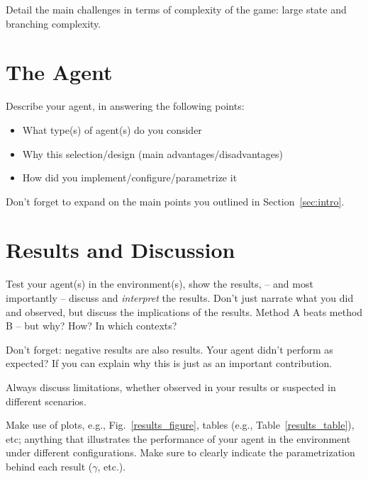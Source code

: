 \documentclass[journal, a4paper]{IEEEtran}
\begin{document}
Detail the main challenges in terms of complexity of the game: large state and branching complexity.


\section{The Agent}

Describe your agent, in answering the following points:
\begin{itemize}
	\item What type(s) of agent(s) do you consider
	\item Why this selection/design (main advantages/disadvantages)
	\item How did you implement/configure/parametrize it 
\end{itemize}

Don't forget to expand on the main points you outlined in Section~\ref{sec:intro}.

\section{Results and Discussion}

Test your agent(s) in the environment(s), show the results, -- and most importantly -- discuss and \emph{interpret} the results. Don't just narrate what you did and observed, but discuss the implications of the results. Method A beats method B -- but why? How? In which contexts?

Don't forget: negative results are also results. Your agent didn't perform as expected? If you can explain why this is just as an important contribution. 

Always discuss limitations, whether observed in your results or suspected in different scenarios. 

Make use of plots, e.g., Fig.~\ref{results_figure}, tables (e.g., Table~\ref{results_table}), etc; anything that illustrates the performance of your agent in the environment under different configurations. Make sure to clearly indicate the parametrization behind each result ($\gamma$, etc.). 

\end{document}

